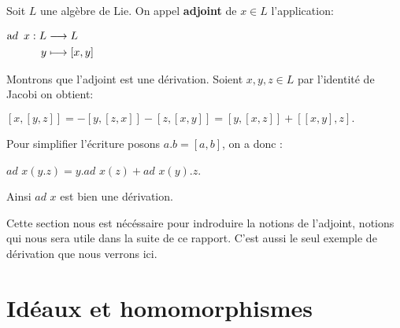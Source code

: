 \documentclass[a4paper,openany,12pt]{report}
\newcommand{\CC}{\mathbb{C}}
\newcommand{\ssl}{\mathfrak{sl}}
\theoremstyle{break}
{\theorembodyfont{\upshape}
\newtheorem*{rmq}{Remarque :}
\newtheorem*{prv}{Preuve :}
\newtheorem*{ex}{Exemples :}
\newtheorem*{exe}{Exemple : }
\newtheorem*{nota}{Notation :}
\newtheorem*{dem}{D\'emonstration :}}
\begin{document}
\begin{exe}
\quad Soit $L$ une algèbre de Lie. On appel \textbf{adjoint} de $x \in L$ l'application:
\begin{center}
$\begin{aligned} \text  ad \enskip x : L & \longrightarrow L \\ y & \longmapsto[x, y] \end{aligned}$
\end{center} 
Montrons que l'adjoint est une dérivation. Soient $x,y,z \in L$ par l'identité de Jacobi on obtient:
\begin{center}
$[x,[y,z]]=-[y,[z,x]]-[z,[x,y]]=[y,[x,z]]+[[x,y],z].$
\end{center}
Pour simplifier l'écriture posons $a.b=[a,b]$, on a donc :
\begin{center}
$ad$ $x(y.z)=y.ad$ $x(z)+ad$ $x(y).z$.
\end{center} 
Ainsi $ad$ $x$ est bien une dérivation.
\end{exe}

Cette section nous est nécéssaire pour indroduire la notions de l'adjoint, notions qui nous sera utile dans la suite de ce rapport. 
C'est aussi le seul exemple de dérivation que nous verrons ici.

\section{Idéaux et homomorphismes}
\end{document}
